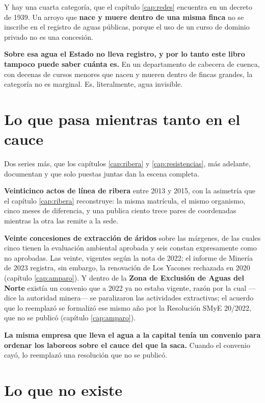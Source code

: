 Y hay una cuarta categoría, que el capítulo \ref{cap:redes} encuentra en un decreto de 1939.
Un arroyo que \textbf{nace y muere dentro de una misma finca} no se inscribe en el registro de
aguas públicas, porque el uso de un curso de dominio privado no es una concesión.

\textbf{Sobre esa agua el Estado no lleva registro, y por lo tanto este libro tampoco puede
saber cuánta es.} En un departamento de cabecera de cuenca, con decenas de cursos menores que
nacen y mueren dentro de fincas grandes, la categoría no es marginal. Es, literalmente, agua
invisible.

\section{Lo que pasa mientras tanto en el cauce}

Dos series más, que los capítulos \ref{cap:ribera} y \ref{cap:resistencias}, más adelante, documentan y que
solo puestas juntas dan la escena completa.

\textbf{Veinticinco actos de línea de ribera} entre 2013 y 2015, con la asimetría que
el capítulo \ref{cap:ribera} reconstruye: la misma matrícula, el mismo organismo, cinco meses
de diferencia, y una publica ciento trece pares de coordenadas mientras la otra las remite a
la sede.

\textbf{Veinte concesiones de extracción de áridos} sobre las márgenes, de las cuales cinco
tienen la evaluación ambiental aprobada y seis constan expresamente como no aprobadas. Las veinte, vigentes según la nota de 2022; el informe de Minería de 2023 registra, sin embargo, la renovación de Los Yacones rechazada en 2020 (capítulo \ref{cap:amparo}). Y dentro de la \textbf{Zona de Exclusión de Aguas del Norte} existía un
convenio que a 2022 ya no estaba vigente, razón por la cual ---dice la autoridad minera--- se paralizaron las actividades extractivas; el acuerdo que lo reemplazó se formalizó ese mismo año por la Resolución SMyE 20/2022, que no se publicó (capítulo \ref{cap:amparo}).

\textbf{La misma empresa que lleva el agua a la capital tenía un convenio para ordenar los
laboreos sobre el cauce del que la saca.} Cuando el convenio cayó, lo reemplazó una resolución que no se publicó.

\section{Lo que no existe}

